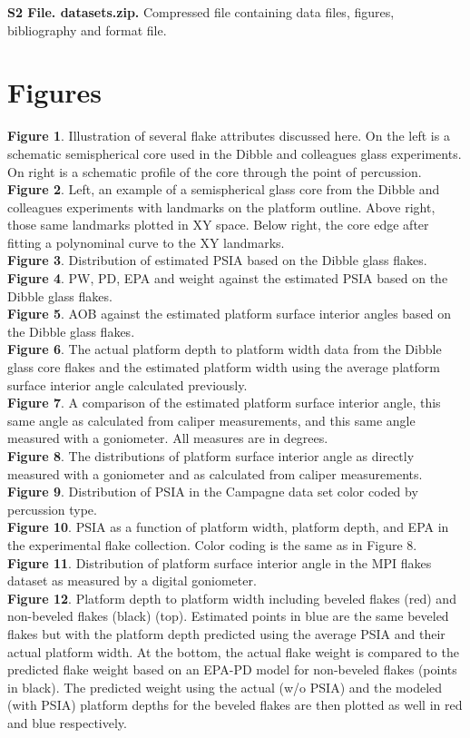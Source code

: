 \documentclass[10pt,letterpaper]{article}
\begin{document}
\textbf{S2 File. datasets.zip.} Compressed file containing data files,
figures, bibliography and format file.

\hypertarget{figures}{%
\section{Figures}\label{figures}}

\textbf{Figure 1}. Illustration of several flake attributes discussed
here. On the left is a schematic semispherical core used in the Dibble
and colleagues glass experiments. On right is a schematic profile of the
core through the point of percussion.\\
\textbf{Figure 2}. Left, an example of a semispherical glass core from
the Dibble and colleagues experiments with landmarks on the platform
outline. Above right, those same landmarks plotted in XY space. Below
right, the core edge after fitting a polynominal curve to the XY
landmarks.\\
\textbf{Figure 3}. Distribution of estimated PSIA based on the Dibble
glass flakes.\\
\textbf{Figure 4}. PW, PD, EPA and weight against the estimated PSIA
based on the Dibble glass flakes.\\
\textbf{Figure 5}. AOB against the estimated platform surface interior
angles based on the Dibble glass flakes.\\
\textbf{Figure 6}. The actual platform depth to platform width data from
the Dibble glass core flakes and the estimated platform width using the
average platform surface interior angle calculated previously.\\
\textbf{Figure 7}. A comparison of the estimated platform surface
interior angle, this same angle as calculated from caliper measurements,
and this same angle measured with a goniometer. All measures are in
degrees.\\
\textbf{Figure 8}. The distributions of platform surface interior angle
as directly measured with a goniometer and as calculated from caliper
measurements.\\
\textbf{Figure 9}. Distribution of PSIA in the Campagne data set color
coded by percussion type.\\
\textbf{Figure 10}. PSIA as a function of platform width, platform
depth, and EPA in the experimental flake collection. Color coding is the
same as in Figure 8.\\
\textbf{Figure 11}. Distribution of platform surface interior angle in
the MPI flakes dataset as measured by a digital goniometer.\\
\textbf{Figure 12}. Platform depth to platform width including beveled
flakes (red) and non-beveled flakes (black) (top). Estimated points in
blue are the same beveled flakes but with the platform depth predicted
using the average PSIA and their actual platform width. At the bottom,
the actual flake weight is compared to the predicted flake weight based
on an EPA-PD model for non-beveled flakes (points in black). The
predicted weight using the actual (w/o PSIA) and the modeled (with PSIA)
platform depths for the beveled flakes are then plotted as well in red
and blue respectively.
\end{document}
